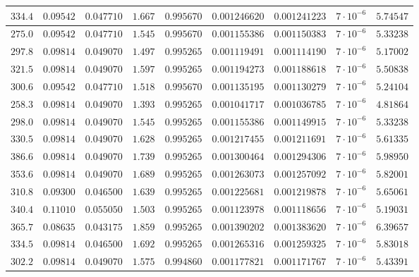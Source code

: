\documentclass[]{article}
\begin{document}
\begin{table}[H]
\begin{tabular}{||c|c|c|c|c|c|c|c|c||}
 
        $334.4$ & $0.09542$ & $0.047710$ & $1.667$ & $0.995670$ & $0.001246620$ & $0.001241223$ & $7 \cdot 10^{-6}$ & $5.74547$ \\\hline
        $275.0$ & $0.09542$ & $0.047710$ & $1.545$ & $0.995670$ & $0.001155386$ & $0.001150383$ & $7 \cdot 10^{-6}$ & $5.33238$ \\\hline
        $297.8$ & $0.09814$ & $0.049070$ & $1.497$ & $0.995265$ & $0.001119491$ & $0.001114190$ & $7 \cdot 10^{-6}$ & $5.17002$ \\\hline
        $321.5$ & $0.09814$ & $0.049070$ & $1.597$ & $0.995265$ & $0.001194273$ & $0.001188618$ & $7 \cdot 10^{-6}$ & $5.50838$ \\\hline
        $300.6$ & $0.09542$ & $0.047710$ & $1.518$ & $0.995670$ & $0.001135195$ & $0.001130279$ & $7 \cdot 10^{-6}$ & $5.24104$ \\\hline
        $258.3$ & $0.09814$ & $0.049070$ & $1.393$ & $0.995265$ & $0.001041717$ & $0.001036785$ & $7 \cdot 10^{-6}$ & $4.81864$ \\\hline
        $298.0$ & $0.09814$ & $0.049070$ & $1.545$ & $0.995265$ & $0.001155386$ & $0.001149915$ & $7 \cdot 10^{-6}$ & $5.33238$ \\\hline
        $330.5$ & $0.09814$ & $0.049070$ & $1.628$ & $0.995265$ & $0.001217455$ & $0.001211691$ & $7 \cdot 10^{-6}$ & $5.61335$ \\\hline
        $386.6$ & $0.09814$ & $0.049070$ & $1.739$ & $0.995265$ & $0.001300464$ & $0.001294306$ & $7 \cdot 10^{-6}$ & $5.98950$ \\\hline
        $353.6$ & $0.09814$ & $0.049070$ & $1.689$ & $0.995265$ & $0.001263073$ & $0.001257092$ & $7 \cdot 10^{-6}$ & $5.82001$ \\\hline
        $310.8$ & $0.09300$ & $0.046500$ & $1.639$ & $0.995265$ & $0.001225681$ & $0.001219878$ & $7 \cdot 10^{-6}$ & $5.65061$ \\\hline
        $340.4$ & $0.11010$ & $0.055050$ & $1.503$ & $0.995265$ & $0.001123978$ & $0.001118656$ & $7 \cdot 10^{-6}$ & $5.19031$ \\\hline
        $365.7$ & $0.08635$ & $0.043175$ & $1.859$ & $0.995265$ & $0.001390202$ & $0.001383620$ & $7 \cdot 10^{-6}$ & $6.39657$ \\\hline
        $334.5$ & $0.09814$ & $0.046500$ & $1.692$ & $0.995265$ & $0.001265316$ & $0.001259325$ & $7 \cdot 10^{-6}$ & $5.83018$ \\\hline
        $302.2$ & $0.09814$ & $0.049070$ & $1.575$ & $0.994860$ & $0.001177821$ & $0.001171767$ & $7 \cdot 10^{-6}$ & $5.43391$ \\\hline

\end{tabular}
\end{table}
\end{document}
